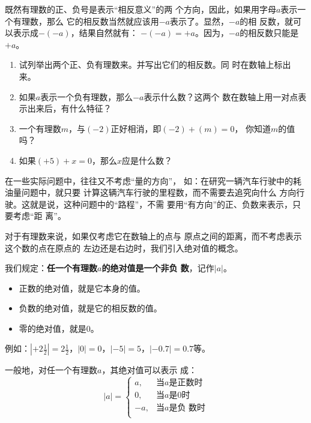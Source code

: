 既然有理数的正、负号是表示“相反意义”的两
个方向，因此，如果用字母$a$表示一个有理数，那么
它的相反数当然就应该用$-a$表示了。显然，$-a$的相
反数，就可以表示成$-(- a)$，结果自然就有：
$-(-a)=+a$。因为，$-a$的相反数只能是$+a$。

\begin{ex}
	\begin{enumerate}
		\item 试列举出两个正、负有理数来。并写出它们的相反数。同
		时在数轴上标出来。
		\item 如果$a$表示一个负有理数，那么$-a$表示什么数？这两个
		数在数轴上用一对点表示出来后，有什么特征？
		\item 一个有理数$m$，与$(-2)$正好相消，即$(-2)+(m)=0$，
		你知道$m$的值吗？
		\item 如果$(+5) +x=0$，那么$x$应是什么数？
	\end{enumerate}    
\end{ex}    

在一些实际问题中，往往又不考虑“量的方向”，
如：在研究一辆汽车行驶中的耗油量问题中，就只要
计算这辆汽车行驶的里程数，而不需要去追究向什么
方向行驶。这就是说，这种问题中的“路程”，不需
要用“有方向”的正、负数来表示，只要考虑“距
离”。

对于有理数来说，如果仅考虑它在数轴上的点与
原点之间的距离，而不考虑表示这个数的点在原点的
左边还是右边时，我们引入绝对值的概念。

我们规定：\textbf{任一个有理数$a$的绝对值是一个非负
	数}，记作$|a|$。

\begin{blk}{}
	\begin{itemize}
		\item 正数的绝对值，就是它本身的值。
		\item 负数的绝对值，就是它的相反数的值。
		\item 零的绝对值，就是0。
	\end{itemize}
\end{blk}

例如：$\left|+2\frac{1}{2}\right|=2\frac{1}{2}$，$|0|=0$，$|-5|=5$，$|-0.7|=0.7$等。

一般地，对任一个有理数$a$，其绝对值可以表示
成：
\[|a|=\begin{cases}
a, & \text{当$a$是正数时}\\
0, & \text{当$a$是0时}\\
-a, & \text{当$a$是负 数时}\\
\end{cases}\]

